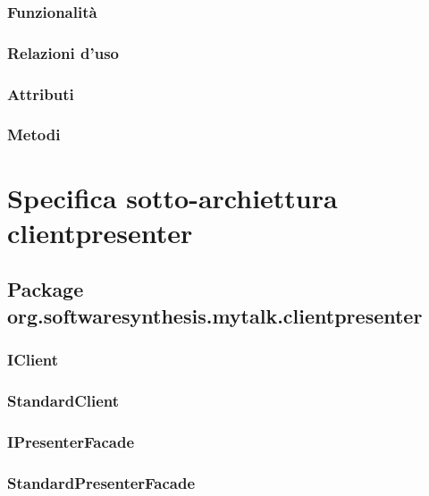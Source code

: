 \subsubsection*{Funzionalità}

\subsubsection*{Relazioni d'uso}

\subsubsection*{Attributi}

\subsubsection*{Metodi}

\clearpage

\section{Specifica sotto-archiettura clientpresenter}\label{clientpresenterarchitecture}

\subsection{Package org.softwaresynthesis.mytalk.clientpresenter}\label{sec:clientpresetner}

\subsubsection{IClient}\label{sec:iclient}

\subsubsection{StandardClient}\label{sec:standardclient}

\subsubsection{IPresenterFacade}\label{sec:ipresenterfacade}

\subsubsection{StandardPresenterFacade}\label{sec:standardserverfacade}

\clearpage

